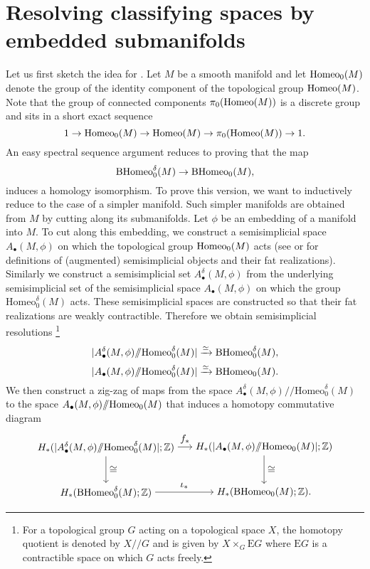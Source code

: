\documentclass[a4paper]{amsart}
\theoremstyle{definition}
\theoremstyle{remark}
\newcommand{\bZ}{\mathbb{Z}}
\newcommand{\hcoker}{/\!\!/}
\newcommand{\tH}{\text{\textnormal{Homeo}}}
\newcommand{\BH}{\mathrm{B}\text{\textnormal{Homeo}}}
\newcommand{\tdH}{\text{Homeo}^{\delta}}
\newcommand{\BdH}{\mathrm{B}\text{\textnormal{Homeo}}^{\delta}}
\numberwithin{equation}{section}
\begin{document}
\section{Resolving classifying spaces by embedded submanifolds}\label{sec2}
Let us first sketch the idea for . Let $M$ be a smooth manifold and let $\tH_0(M)$ denote the group of the identity component of the topological group $\tH(M)$. Note that the group of connected components $\pi_0(\tH(M))$ is a discrete group and sits in a short exact sequence
\[
1\to \tH_0(M)\to \tH(M)\to \pi_0(\tH(M))\to 1. 
\]
An easy spectral sequence argument reduces  to proving that  the map $$\BdH_0(M)\to \BH_0(M),$$ induces a homology isomorphism. To prove this version, we want to inductively reduce  to the case of a simpler manifold. Such simpler manifolds are obtained from $M$  by cutting along its submanifolds. Let $\phi$ be an embedding of a manifold into $M$. To cut along this embedding, we construct a  semisimplicial space $A_{\bullet}(M,\phi)$ on which the topological group $\tH_0(M)$ acts (see \cite{ebert2017semi} or \cite[Section 2]{randal2009resolutions} for definitions of (augmented) semisimplicial objects and their fat realizations). Similarly we construct a semisimplicial set $A^{\delta}_{\bullet}(M,\phi)$ from  the underlying semisimplicial set of the semisimplicial space $A_{\bullet}(M,\phi)$ on which the group $\tdH_0(M)$ acts. 
These semisimplicial spaces are constructed so that their fat realizations are weakly contractible. Therefore we obtain semisimplicial resolutions \footnote{For a topological group $G$ acting on a topological space $X$, the homotopy quotient is denoted by $X\hcoker G$ and is given by $X\times_G \mathrm{E}G$ where $\mathrm{E}G$ is a contractible space on which $G$ acts freely.}
\[
|A^{\delta}_{\bullet}(M,\phi)\hcoker \tdH_0(M)|\xrightarrow{\simeq}\BdH_0(M),
\]
\[
|A_{\bullet}(M,\phi)\hcoker \tdH_0(M)|\xrightarrow{\simeq}\BH_0(M).
\] We then construct a zig-zag of maps from the space $A^{\delta}_{\bullet}(M,\phi)\hcoker \tdH_0(M)$ to the space $A_{\bullet}(M,\phi)\hcoker \tH_0(M)$ that induces a homotopy commutative diagram 
 \[
 \begin{tikzpicture}[node distance=5.6cm, auto]
  \node (B)  {$H_*(|A^{\delta}_{\bullet}(M,\phi)\hcoker \tdH_0(M)|;\bZ)$};
  \node (C) [below of= B, node distance=1.6cm ] {$H_*(\BdH_0(M);\bZ)$};  
    \node (E) [right of= B] {$ H_*(|A_{\bullet}(M,\phi)\hcoker \tH_0(M)|;\bZ)$};
  \node (F) [right of= C ] {$H_*(\BH_0(M);\bZ).$};  
  \draw [->] (B) to node {$f_*$}(E);
  \draw [->] (C) to node {$\iota_*$}(F);
  \draw [->] (B) to node {$\cong$} (C);
  \draw [->] (E) to node {$\cong$} (F);

\end{tikzpicture}
\]
\end{document}
